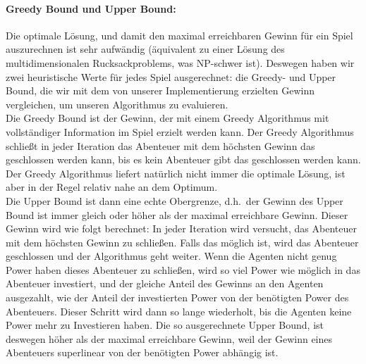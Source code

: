 \documentclass[fleqn,10pt]{SelfArx} %
\begin{document}
\paragraph{Greedy Bound und Upper Bound:}
Die optimale Lösung, und damit den maximal erreichbaren Gewinn für ein Spiel auszurechnen ist sehr aufwändig (äquivalent zu einer Lösung des multidimensionalen Rucksackproblems, was NP-schwer ist). Deswegen haben wir zwei heuristische Werte für jedes Spiel ausgerechnet: die Greedy- und Upper Bound, die wir mit dem von unserer Implementierung erzielten Gewinn vergleichen, um unseren Algorithmus zu evaluieren. \\
Die Greedy Bound ist der Gewinn, der mit einem Greedy Algorithmus mit vollständiger Information im Spiel erzielt werden kann. Der Greedy Algorithmus schließt in jeder Iteration das Abenteuer mit dem höchsten Gewinn das geschlossen werden kann, bis es kein Abenteuer gibt das geschlossen werden kann. Der Greedy Algorithmus liefert natürlich nicht immer die optimale Lösung, ist aber in der Regel relativ nahe an dem Optimum.\\
Die Upper Bound ist dann eine echte Obergrenze, d.h.\ der Gewinn des Upper Bound ist immer gleich oder höher als der maximal erreichbare Gewinn. Dieser Gewinn wird wie folgt berechnet: In jeder Iteration wird versucht, das Abenteuer mit dem höchsten Gewinn zu schließen. Falls das möglich ist, wird das Abenteuer geschlossen und der Algorithmus geht weiter. Wenn die Agenten nicht genug Power haben dieses Abenteuer zu schließen, wird so viel Power wie möglich in das Abenteuer investiert, und der gleiche Anteil des Gewinns an den Agenten ausgezahlt, wie der Anteil der investierten Power von der benötigten Power des Abenteuers. Dieser Schritt wird dann so lange wiederholt, bis die Agenten keine Power mehr zu Investieren haben. Die so ausgerechnete Upper Bound, ist deswegen höher als der maximal erreichbare Gewinn, weil der Gewinn eines Abenteuers superlinear von der benötigten Power abhängig ist.
\end{document}
